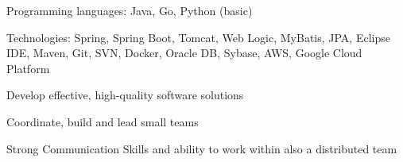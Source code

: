 \begin{cvitems}
    \item {Programming languages: Java, Go, Python (basic)}
    \item {Technologies: Spring, Spring Boot, Tomcat, Web Logic, MyBatis, JPA, Eclipse IDE, Maven, Git, SVN, Docker, Oracle DB, Sybase, AWS, Google Cloud Platform}
    \item {Develop effective, high-quality software solutions}
    \item {Coordinate, build and lead small teams}
    \item {Strong Communication Skills and ability to work within also a distributed team}
\end{cvitems}